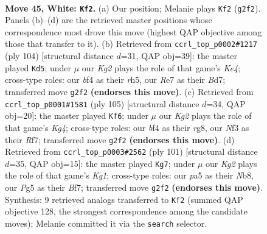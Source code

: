 \documentclass[11pt]{article}
\begin{document}
\clearpage

\begin{figure}[p]\centering
\begin{subfigure}{0.46\textwidth}\centering
\resizebox{\linewidth}{!}{%
\newchessgame
\chessboard[
  setfen={6rk/4R3/8/pp4P1/b1p2b2/P1P2N2/1B4K1/8 w - - 1 45},
  showmover=false,
  pgfstyle=straightmove, color=movearrow, markmove={g2-f2}
]}
\caption{}
\end{subfigure}\hfill
\begin{subfigure}{0.46\textwidth}\centering
\resizebox{\linewidth}{!}{%
\newchessgame
\chessboard[
  setfen={8/3B1k2/1p5P/p5br/P1PPK1N1/8/8/8 w - - 1 53},
  showmover=false,
  pgfstyle=straightmove, color=movearrow, markmove={e4-d5}
]}
\caption{}
\end{subfigure}
\\[4pt]
\begin{subfigure}{0.46\textwidth}\centering
\resizebox{\linewidth}{!}{%
\newchessgame
\chessboard[
  setfen={6R1/5r2/2p1b1n1/p4pk1/P1p5/2P5/2B2K2/5R2 b - - 2 53},
  showmover=false,
  pgfstyle=straightmove, color=movearrow, markmove={g5-f6}
]}
\caption{}
\end{subfigure}\hfill
\begin{subfigure}{0.46\textwidth}\centering
\resizebox{\linewidth}{!}{%
\newchessgame
\chessboard[
  setfen={1n4k1/5b2/3r2p1/P6p/2p1B3/2N4P/6P1/5R1K b - - 1 51},
  showmover=false,
  pgfstyle=straightmove, color=movearrow, markmove={g8-g7}
]}
\caption{}
\end{subfigure}
\caption{\textbf{Move 45, White: \texttt{Kf2}.} (a) Our position; Melanie plays \texttt{Kf2} (\texttt{g2f2}). Panels (b)--(d) are the retrieved master positions whose correspondence most drove this move (highest QAP objective among those that transfer to it). (b) Retrieved from \texttt{ccrl\_top\_p0002\#1217} (ply 104) [structural distance $d$=31, QAP obj=39]: the master played \texttt{Kd5}; under $\mu$ our \emph{Kg2} plays the role of that game's \emph{Ke4}; cross-type roles: our \emph{b}f4 as their \emph{r}h5, our \emph{R}e7 as their \emph{B}d7; transferred move \texttt{g2f2} \textbf{(endorses this move)}. (c) Retrieved from \texttt{ccrl\_top\_p0001\#1581} (ply 105) [structural distance $d$=34, QAP obj=20]: the master played \texttt{Kf6}; under $\mu$ our \emph{Kg2} plays the role of that game's \emph{Kg4}; cross-type roles: our \emph{b}f4 as their \emph{r}g8, our \emph{N}f3 as their \emph{R}f7; transferred move \texttt{g2f2} \textbf{(endorses this move)}. (d) Retrieved from \texttt{ccrl\_top\_p0003\#2562} (ply 101) [structural distance $d$=35, QAP obj=15]: the master played \texttt{Kg7}; under $\mu$ our \emph{Kg2} plays the role of that game's \emph{Kg1}; cross-type roles: our \emph{p}a5 as their \emph{N}b8, our \emph{P}g5 as their \emph{B}f7; transferred move \texttt{g2f2} \textbf{(endorses this move)}. Synthesis: 9 retrieved analogs transferred to \texttt{Kf2} (summed QAP objective 128, the strongest correspondence among the candidate moves); Melanie committed it via the \texttt{search} selector.}
\label{fig:thought-m88}
\end{figure}
\end{document}
